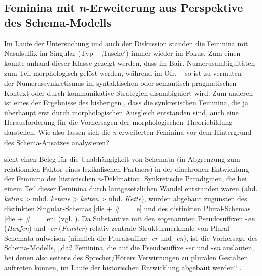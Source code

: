 \subsection{Feminina mit \textit{n}{}-Erweiterung aus Perspektive des Schema-Modells}
\label{sec:10.3.2}
Im Laufe der Untersuchung und auch der Diskussion standen die Feminina mit Nasalsuffix im Singular (Typ  --  ‚Tasche‘) immer wieder im Fokus. Zum einen konnte anhand dieser Klasse gezeigt werden, dass im Bair. Numerusambiguitäten zum Teil morphologisch gelöst werden, während im Ofr. -- so ist zu vermuten -- der Numerussynkretismus im syntaktischen oder se\-man\-tisch-prag\-ma\-ti\-schen Kontext oder durch kommunikative Strategien disambiguiert wird. Zum anderen ist eines der Ergebnisse des bisherigen , dass die synkretischen Feminina, die ja überhaupt erst durch morphologischen Ausgleich entstanden sind, auch eine Herausforderung für die Vorhersagen der morphologischen Theoriebildung darstellen. Wie also lassen sich die \textit{n}{}-erweiterten Feminina vor dem Hintergrund des Schema-Ansatzes analysieren?

\citet[90]{Köpcke1993} sieht einen Beleg für die Unabhängigkeit von Schemata (in Abgrenzung zum relationalen Faktor eines lexikalischen Partners) in der diachronen Entwicklung der Feminina der historischen \textit{n}{}-Deklination. Synkretische Paradigmen, die bei einem Teil dieser Feminina durch lautgesetzlichen Wandel entstanden waren (ahd. \textit{ketina} > mhd. \textit{ketene} > \textit{ketten} > nhd. \textit{Kette}), wurden abgebaut zugunsten des distinkten Singular-Schemas [die + \#\_\_\_e] und des distinkten Plural-Schemas [die + \#\_\_\_en] (vgl. \citealt[§51]{Paul1968}). Da Substantive mit den sogenannten Pseudosuffixen -\textit{en} (\textit{Haufen}) und -\textit{er} (\textit{Fenster}) relativ zentrale Strukturmerkmale von Plural-Schemata aufweisen (nämlich die Pluralsuffixe -\textit{er} und -\textit{en}), ist die Vorhersage des Schema-Modells, „daß Feminina, die auf die Pseudosuffixe \mbox{-\textit{er}} und -\textit{en} auslauten, bei denen also seitens des Sprecher/Hörers Verwirrungen zu pluralen Gestalten auftreten können, im Laufe der historischen Entwicklung abgebaut werden“ \citep[119]{Köpcke1993}.

